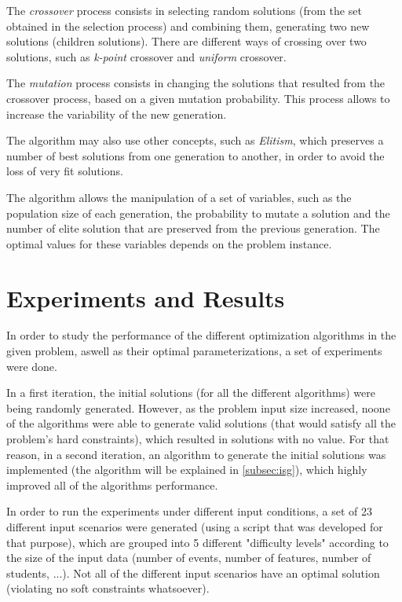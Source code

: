 \documentclass[conference]{IEEEtran}
\begin{document}
The \textit{crossover} process consists in selecting random solutions (from the set obtained in the selection process) and combining them, generating two new solutions (children solutions). There are different ways of crossing over two solutions, such as \textit{k-point} crossover and \textit{uniform} crossover.

The \textit{mutation} process consists in changing the solutions that resulted from the crossover process, based on a given mutation probability. This process allows to increase the variability of the new generation.

The algorithm may also use other concepts, such as \textit{Elitism}, which preserves a number of best solutions from one generation to another, in order to avoid the loss of very fit solutions.

The algorithm allows the manipulation of a set of variables, such as the population size of each generation, the probability to mutate a solution and the number of elite solution that are preserved from the previous generation. The optimal values for these variables depends on the problem instance.

\section{Experiments and Results} \label{sec:ear}

In order to study the performance of the different optimization algorithms in the given problem, aswell as their optimal parameterizations, a set of experiments were done.

In a first iteration, the initial solutions (for all the different algorithms) were being randomly generated. However, as the problem input size increased, noone of the algorithms were able to generate valid solutions (that would satisfy all the problem's hard constraints), which resulted in solutions with no value. For that reason, in a second iteration, an algorithm to generate the initial solutions was implemented (the algorithm will be explained in \autoref{subsec:isg}), which highly improved all of the algorithms performance.

In order to run the experiments under different input conditions, a set of 23 different input scenarios were generated (using a script that was developed for that purpose), which are grouped into 5 different "difficulty levels" according to the size of the input data (number of events, number of features, number of students, ...). Not all of the different input scenarios have an optimal solution (violating no soft constraints whatsoever).
\end{document}
